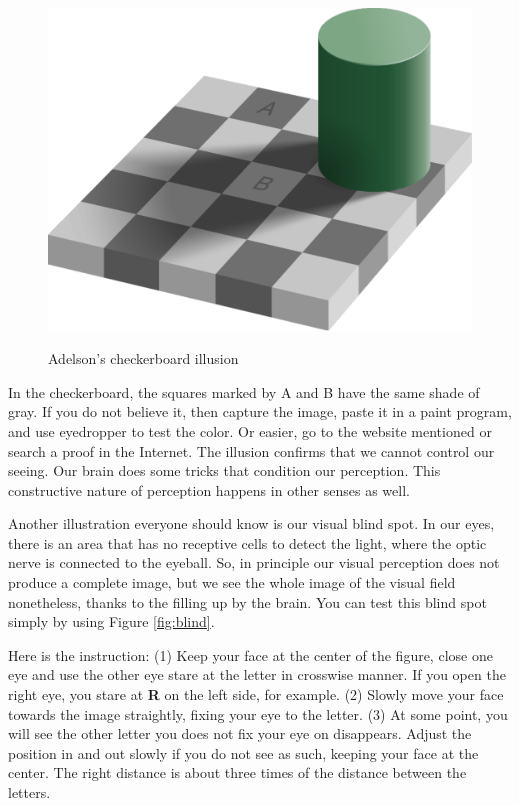 \begin{figure}[!hbt]
\centering
\includegraphics[width=0.8\linewidth]{images/adelson}\\
\caption{Adelson's checkerboard illusion}
\label{fig:adelson}
\end{figure}

In the checkerboard, the squares marked by A and B have the same shade of gray. If you do not believe it, then capture the image, paste it in a paint program, and use eyedropper to test the color. Or easier, go to the website mentioned or search a proof in the Internet. The illusion confirms that we cannot control our seeing. Our brain does some tricks that condition our perception. This constructive nature of perception happens in other senses as well.

Another illustration everyone should know is our visual blind spot. In our eyes, there is an area that has no receptive cells to detect the light, where the optic nerve is connected to the eyeball. So, in principle our visual perception does not produce a complete image, but we see the whole image of the visual field nonetheless, thanks to the filling up by the brain. You can test this blind spot simply by using Figure \ref{fig:blind}.

Here is the instruction: (1) Keep your face at the center of the figure, close one eye and use the other eye stare at the letter in crosswise manner. If you open the right eye, you stare at \textbf{R} on the left side, for example. (2) Slowly move your face towards the image straightly, fixing your eye to the letter. (3) At some point, you will see the other letter you does not fix your eye on disappears. Adjust the position in and out slowly if you do not see as such, keeping your face at the center. The right distance is about three times of the distance between the letters.

